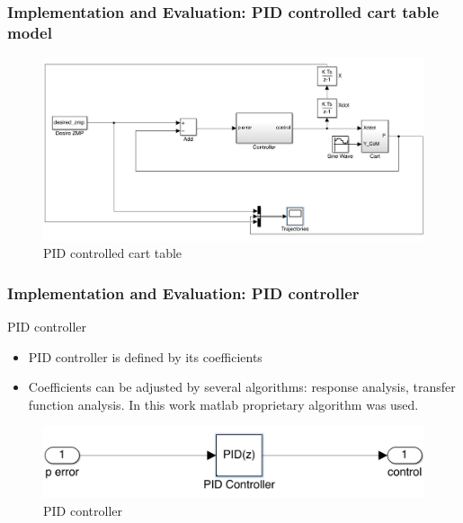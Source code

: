 \documentclass{beamer}
\begin{document}

	\begin{frame}
		\frametitle{Implementation and Evaluation: PID controlled cart table model}
		\begin{figure}[h!]
			\centering
			\includegraphics[width=\linewidth]{presentation_images/19}
			\caption{PID controlled cart table}
		\end{figure}
	\end{frame}


	\begin{frame}
		\frametitle{Implementation and Evaluation: PID controller}
		\begin{block}{PID controller}
			\begin{itemize}
				\item
					PID controller is defined by its coefficients
				\item
					Coefficients can be adjusted by several algorithms: response analysis, transfer function analysis. In this work matlab proprietary algorithm was used. 
			\end{itemize}
		\end{block}
		
		\begin{figure}[h!]
			\centering
			\includegraphics[width=\linewidth]{presentation_images/20}
			\caption{PID controller}
		\end{figure}
	\end{frame}
	
\end{document}
